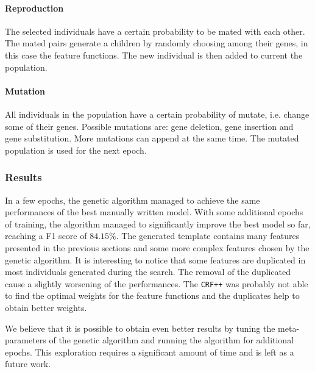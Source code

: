 \paragraph{Reproduction}
The selected individuals have a certain probability to be mated with each other.
The mated pairs generate a children by randomly choosing among their genes, in this case the feature functions.
The new individual is then added to current the population.

\paragraph{Mutation}
All individuals in the population have a certain probability of mutate, i.e. change some of their genes.
Possible mutations are: gene deletion, gene insertion and gene substitution.
More mutations can append at the same time.
The mutated population is used for the next epoch.

\subsubsection{Results}
In a few epochs, the genetic algorithm managed to achieve the same performances of the best manually written model.
With some additional epochs of training, the algorithm managed to significantly improve the best model so far, reaching a F1 score of $84.15\%$.
The generated template contains many features presented in the previous sections and some more complex features chosen by the genetic algorithm.
It is interesting to notice that some features are duplicated in most individuals generated during the search.
The removal of the duplicated cause a slightly worsening of the performances.
The \texttt{CRF++} was probably not able to find the optimal weights for the feature functions and the duplicates help to obtain better weights.

We believe that it is possible to obtain even better results by tuning the meta-parameters of the genetic algorithm and running the algorithm for additional epochs.
This exploration requires a significant amount of time and is left as a future work.
